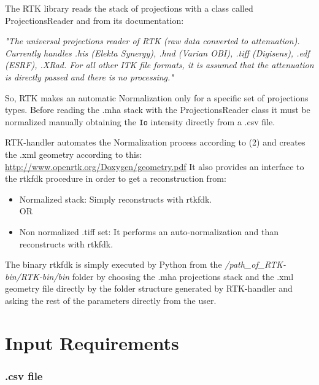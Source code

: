 \documentclass[a4paper,11pt, oneside]{article}
\begin{document}
  The RTK library reads the stack of projections with a class called ProjectionsReader and from its documentation:
  \par \textit{"The universal projections reader of RTK (raw data converted to attenuation). Currently handles .his (Elekta Synergy), .hnd (Varian OBI), .tiff (Digisens), .edf (ESRF), .XRad. For all other ITK file formats, it is assumed that the attenuation is directly passed and there is no processing."\newline}
  \par So, RTK makes an automatic Normalization only for a specific set of projections types. Before reading the .mha stack with the ProjectionsReader class it must be normalized manually obtaining the \texttt{Io} intensity directly from a .csv file.\newline
  \par RTK-handler automates the Normalization process according to (2) and creates the .xml geometry according to this:\newline
  \url{http://www.openrtk.org/Doxygen/geometry.pdf}\newline\newline
  It also provides an interface to the rtkfdk procedure in order to get a reconstruction from:
  \begin{itemize}
    \item Normalized stack:
    Simply reconstructs with rtkfdk.
    \newline
    \\OR
    \item Non normalized .tiff set:
    It performs an auto-normalization and than reconstructs with rtkfdk.\newline
    \end{itemize}
    The binary rtkfdk is simply executed by Python from the \textit{/path\_of\_RTK-bin/RTK-bin/bin} 
    folder by choosing the .mha projections stack and the .xml geometry file directly by the folder structure generated by RTK-handler and asking the rest of the parameters directly from the user. 
  
  
  
  \part{ Input Requirements }
    
    \section{ .csv file }
\end{document}

